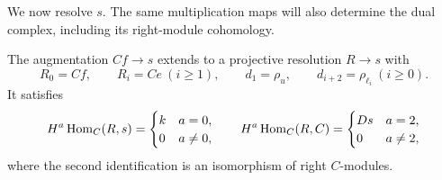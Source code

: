We now resolve \(s\). The same multiplication maps will also determine
the dual complex, including its right-module cohomology.

\begin{proposition}\label{a:resolution}
The augmentation \(Cf\to s\) extends to a projective resolution
\(R\to s\) with
\begin{equation}
R_0=Cf,\qquad R_i=Ce\ (i\ge1),\qquad
d_1=\rho_u,\qquad d_{i+2}=\rho_{\ell_i}\ (i\ge0).
\label{a:simple-resolution}
\end{equation}
It satisfies
\begin{equation}
H^a\operatorname{Hom}_C(R,s)=
\begin{cases}k&a=0,\\0&a\ne0,\end{cases}
\qquad
H^a\operatorname{Hom}_C(R,C)=
\begin{cases}Ds&a=2,\\0&a\ne2,\end{cases}
\label{a:dual-cohomology}
\end{equation}
where the second identification is an isomorphism of right
\(C\)-modules.
\end{proposition}

